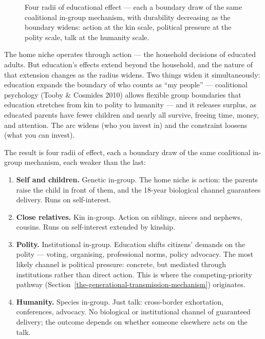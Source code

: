 \documentclass[12pt,letterpaper]{article}
\begin{document}
\begin{figure}[htbp]
\caption[Four radii of educational effect]{Four radii of educational effect --- each a boundary draw
of the same coalitional in-group mechanism, with durability
decreasing as the boundary widens: action at the kin scale,
political pressure at the polity scale, talk at the humanity scale.}
\label{fig:radii}
\end{figure}

The home niche operates through action --- the household decisions of
educated adults. But education's effects extend beyond the household,
and the nature of that extension changes as the radius widens. Two
things widen it simultaneously: education expands the boundary of who
counts as ``my people'' --- coalitional psychology (Tooby \& Cosmides
2010) allows flexible group boundaries that education stretches from kin
to polity to humanity --- and it releases surplus, as educated parents have fewer
children and nearly all survive, freeing time, money, and attention.
The arc widens (who you invest in) and the constraint loosens (what you
can invest).

The result is four radii of effect, each a boundary draw of the
same coalitional in-group mechanism, each weaker than the last:

\begin{enumerate}
\item \textbf{Self and children.} Genetic in-group. The home niche
is action: the parents raise the child in front of them, and the
18-year biological channel guarantees delivery. Runs on
self-interest.

\item \textbf{Close relatives.} Kin in-group. Action on siblings,
nieces and nephews, cousins. Runs on self-interest extended by
kinship.

\item \textbf{Polity.} Institutional in-group. Education shifts
citizens' demands on the polity --- voting, organising, professional
norms, policy advocacy. The most likely channel is political
pressure: concrete, but mediated through institutions rather than
direct action. This is where the competing-priority pathway
(Section~\ref{the-generational-transmission-mechanism}) originates.

\item \textbf{Humanity.} Species in-group. Just talk: cross-border
exhortation, conferences, advocacy. No biological or institutional
channel of guaranteed delivery; the outcome depends on whether
someone elsewhere acts on the talk.
\end{enumerate}
\end{document}
